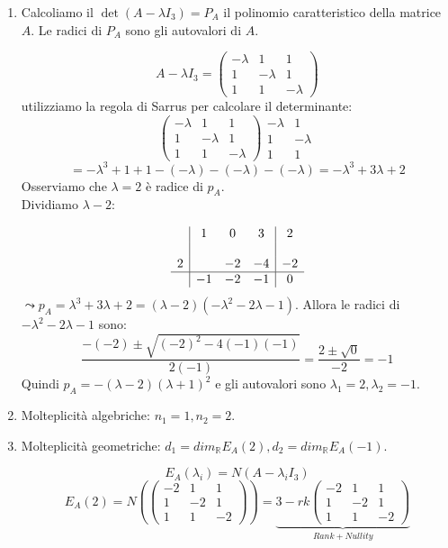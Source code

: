 \documentclass[12pt]{article}
\begin{document}
\begin{enumerate}
    \item Calcoliamo il $\det{(A-\lambda I_3)} = P_A$ il polinomio caratteristico della matrice $A$. Le radici di $P_A$ sono gli autovalori di $A$.

    \[A - \lambda I_3 = \begin{pmatrix}
        -\lambda & 1 & 1\\
        1 & -\lambda & 1\\
        1 & 1 & -\lambda
    \end{pmatrix}\]
    utilizziamo la regola di Sarrus per calcolare il determinante:
    \[\begin{pmatrix}
        -\lambda & 1 & 1\\
        1 & -\lambda & 1\\
        1 & 1 & -\lambda
    \end{pmatrix} \begin{matrix}
        -\lambda & 1\\
        1 & -\lambda\\
        1 & 1
    \end{matrix}\]
    \[= -\lambda^3 + 1 + 1 - (-\lambda) - (-\lambda) - (-\lambda) = -\lambda^3 + 3\lambda + 2\]
Osserviamo che $\lambda = 2$ è radice di $p_A$.\\
Dividiamo $\lambda-2$:

\[
\begin{array}{c|ccc|c}
& 1 & 0 & 3 & 2 \\
& & & & \\
2 &  & -2 & -4 & -2 \\
 \hline
 & -1 & -2 & -1 & 0
\end{array}
\]
$\leadsto p_A = \lambda^3 + 3\lambda + 2 = (\lambda - 2)(-\lambda^2 - 2\lambda -1)$.
Allora le radici di $-\lambda^2 - 2\lambda - 1$ sono:
\[\frac{-(-2) \pm \sqrt{(-2)^2 - 4(-1)(-1)}}{2(-1)} = \frac{2 \pm \sqrt{0}}{-2} = -1\]
Quindi $p_A = -(\lambda-2)(\lambda+1)^2$ e gli autovalori sono $\lambda_1 = 2, \lambda_2 = -1$.

\item Molteplicità algebriche: $n_1 = 1, n_2 = 2$.
\item Molteplicità geometriche: $d_1 = dim_{\mathbb{R}} E_A (2), d_2 = dim_{\mathbb{R}}E_A(-1)$.

\[E_A (\lambda_i) = N(A - \lambda_i I_3)\]
\[E_A(2) = N\left(\begin{pmatrix}
    -2 & 1 & 1\\
    1 & -2 & 1\\
    1 & 1 & -2
\end{pmatrix}\right) = \underbrace{3 - rk\begin{pmatrix}
    -2 & 1 & 1\\
    1 & -2 & 1\\
    1 & 1 & -2
\end{pmatrix}}_{Rank+Nullity}\]


\end{enumerate}
\end{document}

